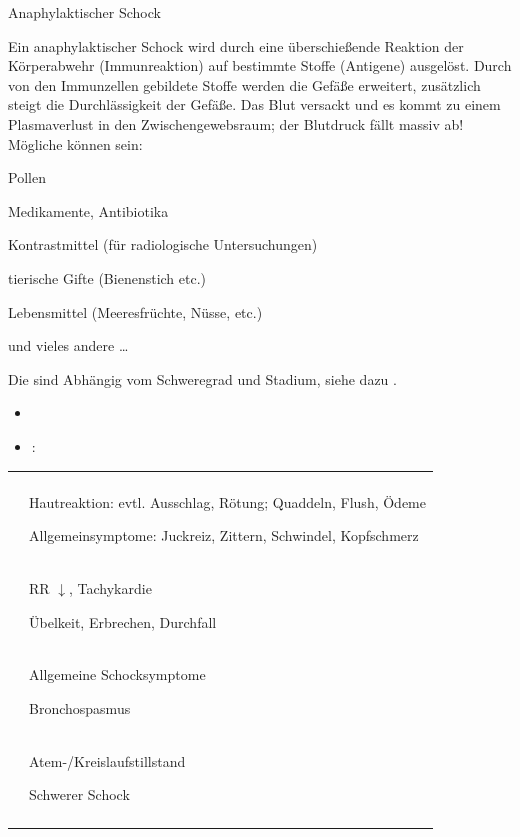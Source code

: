 {Anaphylaktischer Schock}
{\label{topic:schock-anaphylaktischer}
Ein anaphylaktischer Schock wird durch eine
über\-schieß\-ende Reaktion der Körperabwehr (Immunreaktion)
auf bestimmte Stoffe (Antigene) ausgelöst.
Durch von den Immunzellen gebildete Stoffe werden
die Gefäße erweitert, zusätzlich steigt die
Durchlässigkeit der Gefäße.
Das Blut versackt und es kommt zu einem  Plasmaverlust in
den Zwischengewebsraum; der
Blutdruck fällt massiv ab!
Mögliche  können sein: 
\begin{compactitem}
    \item Pollen
    \item Medikamente, Antibiotika
    \item Kontrastmittel (für radiologische Untersuchungen)
    \item tierische Gifte (Bienenstich etc.)
    \item Lebensmittel (Meeresfrüchte, Nüsse, etc.)
    \item und vieles andere \ldots
\end{compactitem}

Die {\TxSymptome} sind Abhängig vom Schweregrad und Stadium,
siehe dazu .
}
{%
\begin{itemize}
  \item {}
\item {\TxSymptome}: 
\end{itemize}
}
{}
{}
{}




\begin{table}[H]
\CorrectionItemizeBox\FontTableBase
{}
\begin{tabulary}{\linewidth}[H]{cL}\addlinespace\toprule\addlinespace
\noindent{}
 &
\noindent{}
\\\addlinespace\midrule\addlinespace
{}
 &
Hautreaktion: evtl. Ausschlag, Rötung;
{Quaddeln}, Flush, Ödeme

Allgemeinsymptome: Juckreiz, Zittern, Schwindel, Kopfschmerz

\\\addlinespace
{}

 &
RR ${\downarrow}$, Tachykardie

Übelkeit, Erbrechen, Durchfall 

\\\addlinespace
{}
 &
Allgemeine Schocksymptome

Bronchospasmus
\\\addlinespace
{}
 &
Atem-/Kreislaufstillstand

Schwerer Schock
\\\addlinespace\bottomrule
\end{tabulary}
\end{table}

